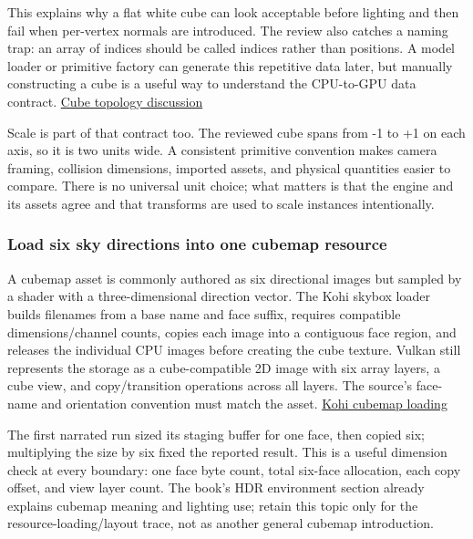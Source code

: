 This explains why a flat white cube can look acceptable before lighting and then fail when per-vertex normals are introduced. The review also catches a naming trap: an array of indices should be called indices rather than positions. A model loader or primitive factory can generate this repetitive data later, but manually constructing a cube is a useful way to understand the CPU-to-GPU data contract. \href{https://www.youtube.com/watch?v=sIAXLH7ZqCw&t=13m50s}{Cube topology discussion}

Scale is part of that contract too. The reviewed cube spans from -1 to +1 on each axis, so it is two units wide. A consistent primitive convention makes camera framing, collision dimensions, imported assets, and physical quantities easier to compare. There is no universal unit choice; what matters is that the engine and its assets agree and that transforms are used to scale instances intentionally.

\subsubsection{Load six sky directions into one cubemap resource}\label{06-engine-ii-ch025-load-six-sky-directions-into-one-cubemap-resource}

\hypertarget{06-engine-ii-ch025-load-six-sky-directions-into-one-cubemap-resource}{}

A cubemap asset is commonly authored as six directional images but sampled by a shader with a three-dimensional direction vector. The Kohi skybox loader builds filenames from a base name and face suffix, requires compatible dimensions/channel counts, copies each image into a contiguous face region, and releases the individual CPU images before creating the cube texture. Vulkan still represents the storage as a cube-compatible 2D image with six array layers, a cube view, and copy/transition operations across all layers. The source's face-name and orientation convention must match the asset. \href{https://www.youtube.com/watch?v=-6yPOAwbjSI}{Kohi cubemap loading}

The first narrated run sized its staging buffer for one face, then copied six; multiplying the size by six fixed the reported result. This is a useful dimension check at every boundary: one face byte count, total six-face allocation, each copy offset, and view layer count. The book's HDR environment section already explains cubemap meaning and lighting use; retain this topic only for the resource-loading/layout trace, not as another general cubemap introduction.

